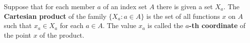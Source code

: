 Suppose that for each member $a$ of an index set $A$ there is given a set $X_a$. The \textbf{Cartesian product} of the family $\{X_a : a \in A\}$ is the set of all functions $x$ on $A$ such that $x_a \in X_a$ for each $a \in A$. The value $x_a$ is called the \textbf{$a$-th coordinate} of the point $x$ of the product.
